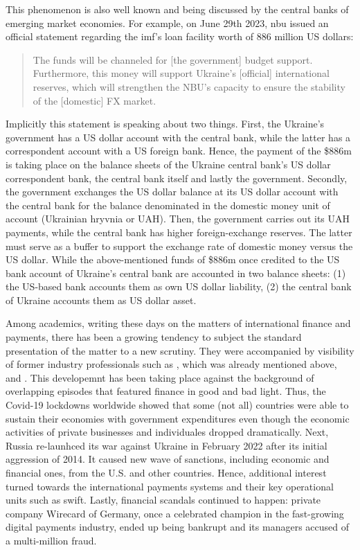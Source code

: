 This phenomenon is also well known and being discussed by the central banks of emerging market economies. For example, on June 29th 2023, \ac{nbu} issued an official statement regarding the \ac{imf}'s loan facility worth of 886 million US dollars:

\begin{quote}
The funds will be channeled for [the government] budget support. Furthermore, this money will support Ukraine's [official] international reserves, which will strengthen the NBU's capacity to ensure the stability of the [domestic] FX market. \cite{nbu2023}
\end{quote}

Implicitly this statement is speaking about two things. First, the Ukraine's government has a US dollar account with the central bank, while the latter has a correspondent account with a US foreign bank. Hence, the payment of the \$886m is taking place on the balance sheets of the Ukraine central bank's US dollar correspondent bank, the central bank itself and lastly the government. Secondly, the government exchanges the US dollar balance at its US dollar account with the central bank for the balance denominated in the domestic money unit of account (Ukrainian hryvnia or UAH). Then, the government carries out its UAH payments, while the central bank has higher foreign-exchange reserves. The latter must serve as a buffer to support the exchange rate of domestic money versus the US dollar. While the above-mentioned funds of \$886m once credited to the US bank account of Ukraine's central bank are accounted in two balance sheets: (1) the US-based bank accounts them as own US dollar liability, (2) the central bank of Ukraine accounts them as US dollar asset.

Among academics, writing these days on the matters of international finance and payments, there has been a growing tendency to subject the standard presentation of the matter to a new scrutiny. They were accompanied by visibility of former industry professionals such as \cite{payoff2021}, which was already mentioned above, and \cite{scott2013,scott2022}. This developemnt has been taking place against the background of overlapping episodes that featured finance in good and bad light. Thus, the Covid-19 lockdowns worldwide showed that some (not all) countries were able to sustain their economies with government expenditures even though the economic activities of private businesses and individuales dropped dramatically. Next, Russia re-launhced its war against Ukraine in February 2022 after its initial aggression of 2014. It caused new wave of sanctions, including economic and financial ones, from the U.S. and other countries. Hence, additional interest turned towards the international payments systems and their key operational units such as \ac{swift}. Lastly, financial scandals continued to happen: private company Wirecard of Germany, once a celebrated champion in the fast-growing digital payments industry, ended up being bankrupt and its managers accused of a multi-million fraud.


